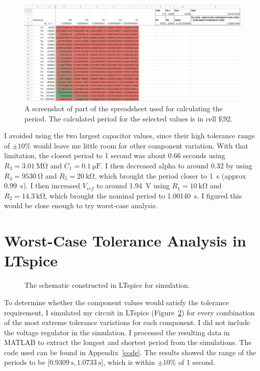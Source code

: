 \documentclass{article}
\begin{document}
\begin{figure}[!ht]
    \centering
    \includegraphics[width=.9\columnwidth]{images/spreadsheet.png}
    \caption{A screenshot of part of the spreadsheet used for calculating the period. The calculated period for the selected values is in cell E92.}
    \label{fig:spreadsheet}
\end{figure}

I avoided using the two largest capacitor values, since their high tolerance range of \(\pm10\%\) would leave me little room for other component variation. With that limitation, the closest period to 1 second was about 0.66 seconds using \(R_3=\qty{3.01}{\mega\ohm}\) and \(C_1=\qty{0.1}{\micro\farad}\). I then decreased alpha to around 0.32 by using \(R_4=\qty{9530}{\ohm}\) and \(R_5=\qty{20}{\kilo\ohm}\), which brought the period closer to \qty{1}{\second} (approx \qty{0.99}{\second}). I then increased \(V_{ref}\) to around \qty{1.94}{\volt} using \(R_1=\qty{10}{\kilo\ohm}\) and \(R_2=\qty{14.3}{\kilo\ohm}\), which brought the nominal period to \qty{1.00140}{\second}. I figured this would be close enough to try worst-case analysis.

\section{Worst-Case Tolerance Analysis in LTspice}

\begin{figure}[!ht]
    \centering
    
    \caption{The schematic constructed in LTspice for simulation.}
    \label{fig:spice_schem}
\end{figure}

To determine whether the component values would satisfy the tolerance requirement, I simulated my circuit in LTspice (Figure~\ref{fig:spice_schem}) for every combination of the most extreme tolerance variations for each component. I did not include the voltage regulator in the simulation. I processed the resulting data in MATLAB to extract the longest and shortest period from the simulations. The code used can be found in Appendix~\ref{code}. The results showed the range of the periods to be \(\lbrack \qty{0.9309}{\second}, \qty{1.0733}{\second}\rbrack\), which is within \(\pm10\%\) of 1 second.
\end{document}
